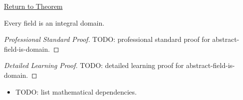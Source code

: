 \newpage
{}
\label{prf:abstract-field-is-domain}

\begin{remark*}[Return]
\hyperref[prop:abstract-field-is-domain]{Return to Theorem}
\end{remark*}

\begin{proposition*}
Every field is an integral domain.
\end{proposition*}

\begin{proof}[Professional Standard Proof]
\LRAProofBodyStart
TODO: professional standard proof for abstract-field-is-domain.
\end{proof}

\begin{proof}[Detailed Learning Proof]
\LRAProofBodyStart
TODO: detailed learning proof for abstract-field-is-domain.
\end{proof}

\begin{remark*}
\end{remark*}

\begin{dependencies}
\begin{itemize}
  \item TODO: list mathematical dependencies.
\end{itemize}
\end{dependencies}

\clearpage
